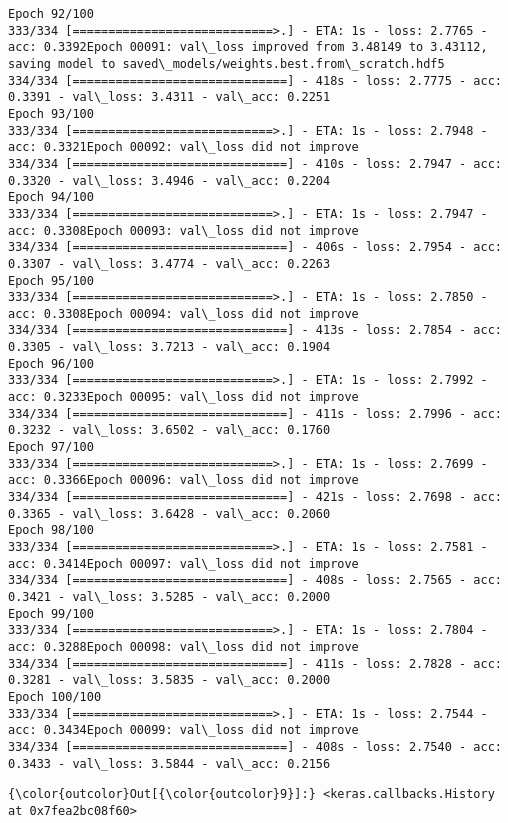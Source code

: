 \documentclass[11pt]{article}
\begin{document}
\begin{Verbatim}[commandchars=\\\{\}]
Epoch 92/100
333/334 [============================>.] - ETA: 1s - loss: 2.7765 - acc: 0.3392Epoch 00091: val\_loss improved from 3.48149 to 3.43112, saving model to saved\_models/weights.best.from\_scratch.hdf5
334/334 [==============================] - 418s - loss: 2.7775 - acc: 0.3391 - val\_loss: 3.4311 - val\_acc: 0.2251
Epoch 93/100
333/334 [============================>.] - ETA: 1s - loss: 2.7948 - acc: 0.3321Epoch 00092: val\_loss did not improve
334/334 [==============================] - 410s - loss: 2.7947 - acc: 0.3320 - val\_loss: 3.4946 - val\_acc: 0.2204
Epoch 94/100
333/334 [============================>.] - ETA: 1s - loss: 2.7947 - acc: 0.3308Epoch 00093: val\_loss did not improve
334/334 [==============================] - 406s - loss: 2.7954 - acc: 0.3307 - val\_loss: 3.4774 - val\_acc: 0.2263
Epoch 95/100
333/334 [============================>.] - ETA: 1s - loss: 2.7850 - acc: 0.3308Epoch 00094: val\_loss did not improve
334/334 [==============================] - 413s - loss: 2.7854 - acc: 0.3305 - val\_loss: 3.7213 - val\_acc: 0.1904
Epoch 96/100
333/334 [============================>.] - ETA: 1s - loss: 2.7992 - acc: 0.3233Epoch 00095: val\_loss did not improve
334/334 [==============================] - 411s - loss: 2.7996 - acc: 0.3232 - val\_loss: 3.6502 - val\_acc: 0.1760
Epoch 97/100
333/334 [============================>.] - ETA: 1s - loss: 2.7699 - acc: 0.3366Epoch 00096: val\_loss did not improve
334/334 [==============================] - 421s - loss: 2.7698 - acc: 0.3365 - val\_loss: 3.6428 - val\_acc: 0.2060
Epoch 98/100
333/334 [============================>.] - ETA: 1s - loss: 2.7581 - acc: 0.3414Epoch 00097: val\_loss did not improve
334/334 [==============================] - 408s - loss: 2.7565 - acc: 0.3421 - val\_loss: 3.5285 - val\_acc: 0.2000
Epoch 99/100
333/334 [============================>.] - ETA: 1s - loss: 2.7804 - acc: 0.3288Epoch 00098: val\_loss did not improve
334/334 [==============================] - 411s - loss: 2.7828 - acc: 0.3281 - val\_loss: 3.5835 - val\_acc: 0.2000
Epoch 100/100
333/334 [============================>.] - ETA: 1s - loss: 2.7544 - acc: 0.3434Epoch 00099: val\_loss did not improve
334/334 [==============================] - 408s - loss: 2.7540 - acc: 0.3433 - val\_loss: 3.5844 - val\_acc: 0.2156

    \end{Verbatim}

\begin{Verbatim}[commandchars=\\\{\}]
{\color{outcolor}Out[{\color{outcolor}9}]:} <keras.callbacks.History at 0x7fea2bc08f60>
\end{Verbatim}
            
\end{document}
